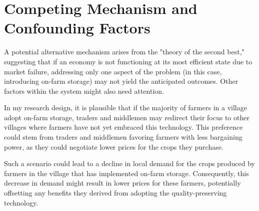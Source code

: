 \newpage
\section{Competing Mechanism and Confounding Factors}
A potential alternative mechanism arises from the "theory of the second best," suggesting that if an economy is not functioning at its most efficient state due to market failure, addressing only one aspect of the problem (in this case, introducing on-farm storage) may not yield the anticipated outcomes. Other factors within the system might also need attention.

In my research design, it is plausible that if the majority of farmers in a village adopt on-farm storage, traders and middlemen may redirect their focus to other villages where farmers have not yet embraced this technology. This preference could stem from traders and middlemen favoring farmers with less bargaining power, as they could negotiate lower prices for the crops they purchase.

Such a scenario could lead to a decline in local demand for the crops produced by farmers in the village that has implemented on-farm storage. Consequently, this decrease in demand might result in lower prices for these farmers, potentially offsetting any benefits they derived from adopting the quality-preserving technology.

